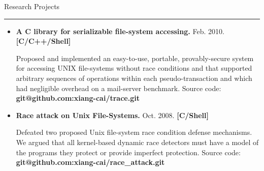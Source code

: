 \documentclass[11pt,oneside]{article}
\newenvironment{ressection}[1]{
	\vspace{-1pt}
	{\fontfamily{phv}\selectfont\Large#1}
	
	\vspace{-8pt} \rule{\textwidth}{.5pt}
	
	\vspace{-8pt}
	\begin{itemize}
	\vspace{.5pt}
}{
	\end{itemize}
}
\newcommand{\resitem}[1]{
	\vspace{1pt}
	\item \begin{flushleft} #1 \end{flushleft}
}
\begin{document}
\begin{ressection}{Research Projects}
	\vspace{-4pt}
	\resitem{\textbf{A C library for serializable file-system
				accessing.} Feb. 2010. \hfill\textbf{[C/C++/Shell]} 
		\vspace{-2pt}
		\begin{small}
		
		Proposed and implemented an
					easy-to-use, portable, provably-secure system for
					accessing UNIX file-systems without race conditions
					and that supported arbitrary sequences of operations
					within each pseudo-transaction and which had
					negligible overhead on a mail-server
					benchmark. Source code: \textbf{git@github.com:xiang-cai/trace.git}
		\end{small}
	}
	
	\vspace{-4pt}
	\resitem{\textbf{Race attack on Unix File-Systems.} Oct. 2008. \hfill\textbf{[C/Shell]}
		\vspace{-2pt}
		\begin{small}

		Defeated two proposed Unix file-system race
			condition defense mechanisms. We argued that all
			kernel-based dynamic race detectors must have a model of
			the programs they protect or provide imperfect
			protection. Source code: \textbf{git@github.com:xiang-cai/race\_attack.git}
		\end{small}
	} 



\end{ressection}
\end{document}
